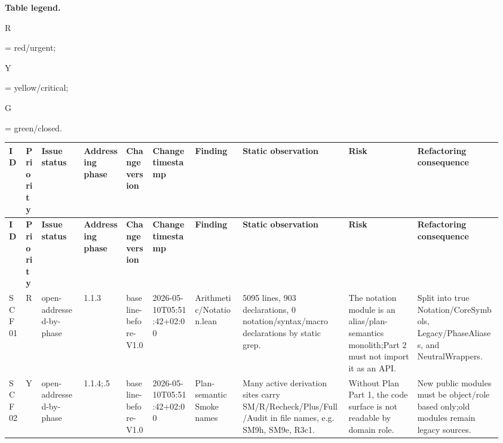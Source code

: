 \footnotesize
\par\smallskip\noindent\begin{minipage}{0.99\linewidth}\footnotesize\raggedright\textbf{Table legend.} \colorbox{red!20}{\strut R} = red/urgent; \colorbox{yellow!25}{\strut Y} = yellow/critical; \colorbox{green!18}{\strut G} = green/closed.\end{minipage}\par\vspace{0.25em}
\begin{longtable}{L{0.03\linewidth} L{0.026\linewidth} L{0.087\linewidth} L{0.085\linewidth} L{0.052\linewidth} L{0.085\linewidth} L{0.095\linewidth} L{0.205\linewidth} L{0.13\linewidth} L{0.165\linewidth}}
\hline
\textbf{ID} & \textbf{Priority} & \textbf{Issue status} & \textbf{Addressing phase} & \textbf{Change version} & \textbf{Change timestamp} & \textbf{Finding} & \textbf{Static observation} & \textbf{Risk} & \textbf{Refactoring consequence}\\
\hline
\endfirsthead
\hline
\textbf{ID} & \textbf{Priority} & \textbf{Issue status} & \textbf{Addressing phase} & \textbf{Change version} & \textbf{Change timestamp} & \textbf{Finding} & \textbf{Static observation} & \textbf{Risk} & \textbf{Refactoring consequence}\\
\hline
\endhead
SCF01 & R & open-addressed-by-phase & 1.1.3 & baseline-before-V1.0 & 2026-05-10T05:51:42+02:00 & Arithmetic/\allowbreak{}Notation.lean & 5095 lines, 903 declarations, 0 notation/\allowbreak{}syntax/\allowbreak{}macro declarations by static grep. & The notation module is an alias/\allowbreak{}plan-semantics monolith;\newline Part 2 must not import it as an API. & Split into true Notation/\allowbreak{}CoreSymbols, Legacy/\allowbreak{}PhaseAliases, and NeutralWrappers.\\
\hline
\addlinespace[0.24em]
SCF02 & Y & open-addressed-by-phase & 1.1.4;.5 & baseline-before-V1.0 & 2026-05-10T05:51:42+02:00 & Plan-semantic Smoke names & Many active derivation sites carry SM/\allowbreak{}R/\allowbreak{}Recheck/\allowbreak{}Plus/\allowbreak{}Full/\allowbreak{}Audit in file names, e.g. SM9h, SM9e, R3c1. & Without Plan Part 1, the code surface is not readable by domain role. & New public modules must be object/\allowbreak{}role based only;\newline old modules remain legacy sources.\\

\end{longtable}
